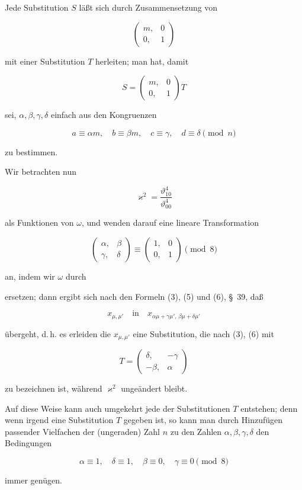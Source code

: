 Jede Substitution $S$ läßt sich durch Zusammensetzung von

\[
\begin{pmatrix} m, & 0 \\ 0, & 1 \end{pmatrix}
\]

mit einer Substitution $T$ herleiten; man hat, damit

\[
S = \begin{pmatrix} m, & 0 \\ 0, & 1 \end{pmatrix} T
\]

sei, $\alpha, \beta, \gamma, \delta$ einfach aus den Kongruenzen

\[
a \equiv \alpha m, \quad b \equiv \beta m, \quad c \equiv \gamma, \quad d \equiv \delta \pmod{n}
\]

zu bestimmen.

Wir betrachten nun


\[
\varkappa^2 = \frac{\vartheta_{10}^4}{\vartheta_{00}^4}
\]

als Funktionen von $\omega$, und wenden darauf eine lineare Transformation

\[
\begin{pmatrix} \alpha, & \beta \\ \gamma, & \delta \end{pmatrix} \equiv \begin{pmatrix} 1, & 0 \\ 0, & 1 \end{pmatrix} \pmod{8}
\]

an, indem wir $\omega$ durch


ersetzen; dann ergibt sich nach den Formeln (3), (5) und (6), \S\, 39, daß

\[
x_{\mu,\mu'} \quad \text{in} \quad x_{\alpha\mu + \gamma\mu',\,\beta\mu + \delta\mu'}
\]

übergeht, d.\,h. es erleiden die $x_{\mu,\mu'}$ eine Substitution, die nach (3), (6) mit

\[
T = \begin{pmatrix} \delta, & -\gamma \\ -\beta, & \alpha \end{pmatrix}
\]

zu bezeichnen ist, während $\varkappa^2$ ungeändert bleibt.

Auf diese Weise kann auch umgekehrt jede der Substitutionen $T$ entstehen; denn wenn irgend eine Substitution $T$ gegeben ist, so kann man durch Hinzufügen passender Vielfachen der (ungeraden) Zahl $n$ zu den Zahlen $\alpha, \beta, \gamma, \delta$ den Bedingungen

\[
\alpha \equiv 1, \quad \delta \equiv 1, \quad \beta \equiv 0, \quad \gamma \equiv 0 \pmod{8}
\]

immer genügen.
